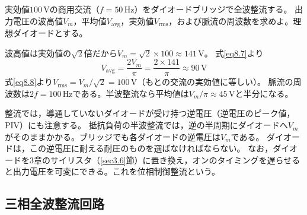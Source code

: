 \begin{例題}[商用電源の整流]
\label{rei8.1}
実効値$100$\,Vの商用交流（$f = 50$\,Hz）をダイオードブリッジで全波整流する。
出力電圧の波高値$V_m$，平均値$V_{\mathrm{avg}}$，実効値$V_{\mathrm{rms}}$，および脈流の周波数を求めよ。理想ダイオードとする。
\begin{解答}
波高値は実効値の$\sqrt{2}$倍だから$V_m = \sqrt{2}\times100 \approx 141$\,V。
式\ref{eq8.7}より
\begin{equation*}
V_{\mathrm{avg}} = \frac{2V_m}{\pi} = \frac{2\times141}{\pi} \approx 90\,\mathrm{V}
\end{equation*}
式\ref{eq8.8}より$V_{\mathrm{rms}} = V_m/\sqrt{2} = 100$\,V（もとの交流の実効値に等しい）。
脈流の周波数は$2f = 100$\,Hzである。半波整流なら平均値は$V_m/\pi \approx 45$\,Vと半分になる。
\end{解答}
\end{例題}

\begin{注意}
整流では，導通していないダイオードが受け持つ逆電圧（逆電圧のピーク値，PIV）にも注意する。
抵抗負荷の半波整流では，逆の半周期にダイオードへ$V_m$がそのままかかる。ブリッジでも各ダイオードの逆電圧は$V_m$である。
ダイオードは，この逆電圧に耐える耐圧のものを選ばなければならない。
なお，ダイオードを3章のサイリスタ（\ref{sec3.6}節）に置き換え，オンのタイミングを遅らせると出力電圧を可変にできる。これを位相制御整流という。
\end{注意}

\subsection{三相全波整流回路}


